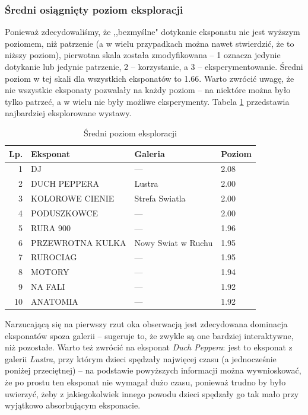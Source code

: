 \documentclass[conference]{IEEEtran}
\begin{document}
\subsubsection{Średni osiągnięty poziom eksploracji}
Ponieważ zdecydowaliśmy, że ,,bezmyślne" dotykanie eksponatu nie jest wyższym poziomem, niż patrzenie (a w wielu przypadkach można nawet stwierdzić, że to niższy poziom), pierwotna skala została zmodyfikowana -- 1 oznacza jedynie dotykanie lub jedynie patrzenie, 2 -- korzystanie, a 3 -- eksperymentowanie. Średni poziom w tej skali dla wszystkich eksponatów to 1.66. Warto zwrócić uwagę, że nie wszystkie eksponaty pozwalały na każdy poziom -- na niektóre można było tylko patrzeć, a w wielu nie były możliwe eksperymenty. Tabela \ref{top_zach} przedstawia najbardziej eksplorowane wystawy.
\begin{table}[H]
\caption{Średni poziom eksploracji}
\label{top_zach}
\centering
\begin{tabular}{|r|l|l|l|}
\hline
\textbf{Lp.} & \textbf{Eksponat} & \textbf{Galeria} & \textbf{Poziom} \\
\hline
1  &                DJ &             ---        &     2.08    \\
2  &      DUCH PEPPERA &             Lustra     &        2.00 \\
3  &   KOLOROWE CIENIE &     Strefa Swiatla     &        2.00 \\
4  &       PODUSZKOWCE &             ---        &     2.00    \\
5  &          RURA 900 &             ---        &     1.96    \\
6  &  PRZEWROTNA KULKA & Nowy Swiat w Ruchu     &        1.95 \\
7  &          RUROCIAG &             ---        &     1.95    \\
8  &            MOTORY &             ---        &     1.94    \\
9  &           NA FALI &             ---        &     1.92    \\
10 &          ANATOMIA &             ---        &     1.92    \\
\hline
\end{tabular}
\end{table}
Narzucającą się na pierwszy rzut oka obserwacją jest zdecydowana dominacja eksponatów spoza galerii -- sugeruje to, że zwykle są one bardziej interaktywne, niż pozostałe. Warto też zwrócić na eksponat \textit{Duch Peppera}: jest to eksponat z galerii \textit{Lustra}, przy którym dzieci spędzały najwięcej czasu (a jednocześnie poniżej przeciętnej) -- na podstawie powyższych informacji można wywnioskować, że po prostu ten eksponat nie wymagał dużo czasu, ponieważ trudno by było uwierzyć, żeby z jakiegokolwiek innego powodu dzieci spędzały go tak mało przy wyjątkowo absorbującym eksponacie.
\end{document}
